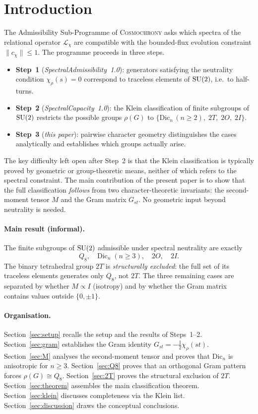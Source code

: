 \section{Introduction}
  \label{sec:intro}

  The Admissibility Sub-Programme of \textsc{Cosmochrony} asks which spectra of the
  relational operator $\mathcal{L}_\chi$ are compatible with the bounded-flux evolution
  constraint $\|c_\chi\| \le 1$.
  The programme proceeds in three steps.
  \begin{itemize}
    \item \textbf{Step~1} (\emph{SpectralAdmissibility~1.0}):
    generators satisfying the neutrality condition $\chi_\rho(s) = 0$ correspond
    to traceless elements of $\mathrm{SU}(2)$, i.e.\ to half-turns.
    \item \textbf{Step~2} (\emph{SpectralCapacity~1.0}):
    the Klein classification of finite subgroups of $\mathrm{SU}(2)$ restricts the
    possible groups $\rho(G)$ to
    $\{\mathrm{Dic}_n\,(n \ge 2),\; 2T,\; 2O,\; 2I\}$.
    \item \textbf{Step~3} (\emph{this paper}):
    pairwise character geometry distinguishes the cases analytically and
    establishes which groups actually arise.
  \end{itemize}

  The key difficulty left open after Step~2 is that the Klein classification is
  typically proved by geometric or group-theoretic means, neither of which refers
  to the spectral constraint.
  The main contribution of the present paper is to show that the full classification
  \emph{follows} from two character-theoretic invariants:
  the second-moment tensor $M$ and the Gram matrix $G_{st}$.
  No geometric input beyond neutrality is needed.

  \paragraph{Main result (informal).}
    The finite subgroups of $\mathrm{SU}(2)$ admissible under spectral neutrality are exactly
    \[
      Q_8,\quad \mathrm{Dic}_n\;(n \ge 3),\quad 2O,\quad 2I.
    \]
    The binary tetrahedral group $2T$ is \emph{structurally excluded}: the full set of
    its traceless elements generates only $Q_8$, not $2T$.
    The three remaining cases are separated by whether $M \propto I$ (isotropy)
    and by whether the Gram matrix contains values outside $\{0, \pm 1\}$.

  \paragraph{Organisation.}
    Section~\ref{sec:setup} recalls the setup and the results of Steps~1--2.
    Section~\ref{sec:gram} establishes the Gram identity $G_{st} = -\tfrac{1}{2}\chi_\rho(st)$.
    Section~\ref{sec:M} analyses the second-moment tensor and proves that
    $\mathrm{Dic}_n$ is anisotropic for $n \ge 3$.
    Section~\ref{sec:Q8} proves that an orthogonal Gram pattern forces $\rho(G) \cong Q_8$.
    Section~\ref{sec:2T} proves the structural exclusion of $2T$.
    Section~\ref{sec:theorem} assembles the main classification theorem.
    Section~\ref{sec:klein} discusses completeness via the Klein list.
    Section~\ref{sec:discussion} draws the conceptual conclusions.
